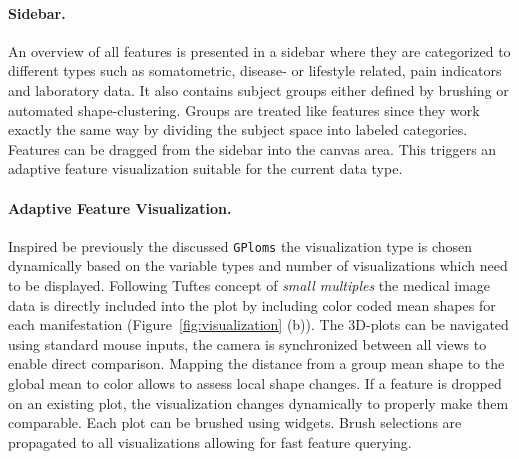 \documentclass[journal]{style/vgtc} 			          %
\begin{document}
\paragraph{Sidebar.}
An overview of all features is presented in a sidebar where they are categorized to different types such as somatometric, disease- or lifestyle related, pain indicators and laboratory data.
%
It also contains subject groups either defined by brushing or automated shape-clustering.
%
Groups are treated like features since they work exactly the same way by dividing the subject space into labeled categories.
%
Features can be dragged from the sidebar into the canvas area.
%
This triggers an adaptive feature visualization suitable for the current data type.

\paragraph{Adaptive Feature Visualization.} \label{sec:AdaptiveFeatureVisualization}
Inspired be previously the discussed \texttt{GPloms} \cite{Francois2013} the visualization type is chosen dynamically based on the variable types and number of visualizations which need to be displayed.
%
Following Tuftes concept of \emph{small multiples} \cite{Tufte1983} the medical image data is directly included into the plot by including color coded mean shapes for each manifestation (Figure~\ref{fig:visualization} (b)).
%
The 3D-plots can be navigated using standard mouse inputs, the camera is synchronized between all views to enable direct comparison.
%
Mapping the distance from a group mean shape to the global mean to color allows to assess local shape changes.
If a feature is dropped on an existing plot, the visualization changes dynamically to properly make them comparable. 
%
Each plot can be brushed using widgets.
%
Brush selections are propagated to all visualizations allowing for fast feature querying.
%
%
\end{document}
